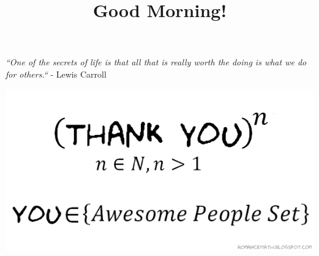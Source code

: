 \documentclass{ximera}
\title{Good Morning!}
\begin{document}
\begin{abstract}

\end{abstract}

\maketitle

\emph{``One of the secrets of life is that all that is really worth the doing is what we do for others.``} - Lewis Carroll



\begin{image}
\includegraphics{thankyou.png}
\end{image}
\end{document}
